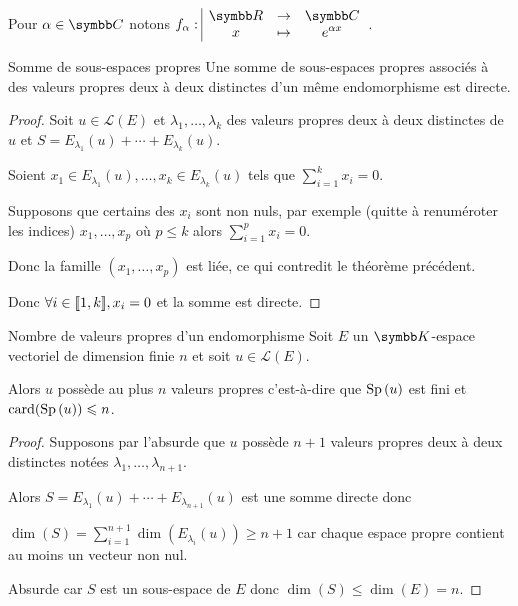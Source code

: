 \begin{exemple}
    Pour $\alpha \in \C$ notons $\fonction{f_\alpha}{\R}{\C}{x}{e^{\alpha x}}$.
\end{exemple}

\begin{theoreme}{Somme de sous-espaces propres}{}
    Une somme de sous-espaces propres associés à des valeurs propres deux à deux distinctes 
    d'un même endomorphisme est directe. 
\end{theoreme}


\begin{proof}
    Soit $u \in \mathscr L(E)$ et $\lambda_1, \ldots, \lambda_k$ des valeurs propres deux à deux distinctes de $u$
    et $S = E_{\lambda_1}(u) + \cdots + E_{\lambda_k}(u)$.

    Soient $x_1 \in E_{\lambda_1}(u), \ldots, x_k \in E_{\lambda_k}(u)$ tels que
    $\displaystyle \sum_{i = 1}^k x_i = 0$.

    Supposons que certains des $x_i$ sont non nuls, par exemple (quitte à renuméroter les indices)
    $x_1, \dots, x_p$ où $p \leqslant k$ alors $\displaystyle \sum_{i = 1}^p x_i = 0$.

    Donc la famille $(x_1, \ldots, x_p)$ est liée, ce qui contredit le théorème précédent. 

    Donc $\forall i \in [\![1, k]\!], x_i = 0$ et la somme est directe.
\end{proof}

\begin{theoreme}{Nombre de valeurs propres d'un endomorphisme}{}
    Soit $E$ un $\K$-espace vectoriel de dimension finie $n$ et soit $u \in \mathscr L(E)$.

    Alors $u$ possède au plus $n$ valeurs propres c'est-à-dire que $\operatorname{Sp} \,(u)$ est fini et 
    $\operatorname{card}(\operatorname{Sp} \,(u)) \leqslant n$.
\end{theoreme}


\begin{proof}
    Supposons par l'absurde que $u$ possède $n + 1$ valeurs propres deux à deux distinctes
    notées $\lambda_1, \ldots, \lambda_{n + 1}$.

    Alors $S = E_{\lambda_1}(u) + \cdots + E_{\lambda_{n + 1}}(u)$ est une somme directe
    donc 
    
    $\displaystyle \dim(S) = \sum_{i = 1}^{n + 1} \dim(E_{\lambda_i}(u)) \geqslant n + 1$ car
    chaque espace propre contient au moins un vecteur non nul.

    Absurde car $S$ est un sous-espace de $E$ donc $\dim(S) \leqslant \dim(E) = n$.
\end{proof}

